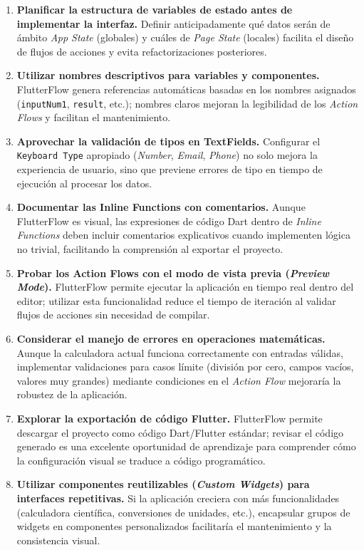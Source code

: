 \documentclass[12pt,a4paper]{article}
\begin{document}
\begin{enumerate}
  \item \textbf{Planificar la estructura de variables de estado antes de implementar la interfaz.} Definir anticipadamente qué datos serán de ámbito \textit{App State} (globales) y cuáles de \textit{Page State} (locales) facilita el diseño de flujos de acciones y evita refactorizaciones posteriores.

  \item \textbf{Utilizar nombres descriptivos para variables y componentes.} FlutterFlow genera referencias automáticas basadas en los nombres asignados (\texttt{inputNum1}, \texttt{result}, etc.); nombres claros mejoran la legibilidad de los \textit{Action Flows} y facilitan el mantenimiento.

  \item \textbf{Aprovechar la validación de tipos en TextFields.} Configurar el \texttt{Keyboard Type} apropiado (\textit{Number}, \textit{Email}, \textit{Phone}) no solo mejora la experiencia de usuario, sino que previene errores de tipo en tiempo de ejecución al procesar los datos.

  \item \textbf{Documentar las Inline Functions con comentarios.} Aunque FlutterFlow es visual, las expresiones de código Dart dentro de \textit{Inline Functions} deben incluir comentarios explicativos cuando implementen lógica no trivial, facilitando la comprensión al exportar el proyecto.

  \item \textbf{Probar los Action Flows con el modo de vista previa (\textit{Preview Mode}).} FlutterFlow permite ejecutar la aplicación en tiempo real dentro del editor; utilizar esta funcionalidad reduce el tiempo de iteración al validar flujos de acciones sin necesidad de compilar.

  \item \textbf{Considerar el manejo de errores en operaciones matemáticas.} Aunque la calculadora actual funciona correctamente con entradas válidas, implementar validaciones para casos límite (división por cero, campos vacíos, valores muy grandes) mediante condiciones en el \textit{Action Flow} mejoraría la robustez de la aplicación.

  \item \textbf{Explorar la exportación de código Flutter.} FlutterFlow permite descargar el proyecto como código Dart/Flutter estándar; revisar el código generado es una excelente oportunidad de aprendizaje para comprender cómo la configuración visual se traduce a código programático.

  \item \textbf{Utilizar componentes reutilizables (\textit{Custom Widgets}) para interfaces repetitivas.} Si la aplicación creciera con más funcionalidades (calculadora científica, conversiones de unidades, etc.), encapsular grupos de widgets en componentes personalizados facilitaría el mantenimiento y la consistencia visual.
\end{enumerate}
\end{document}
